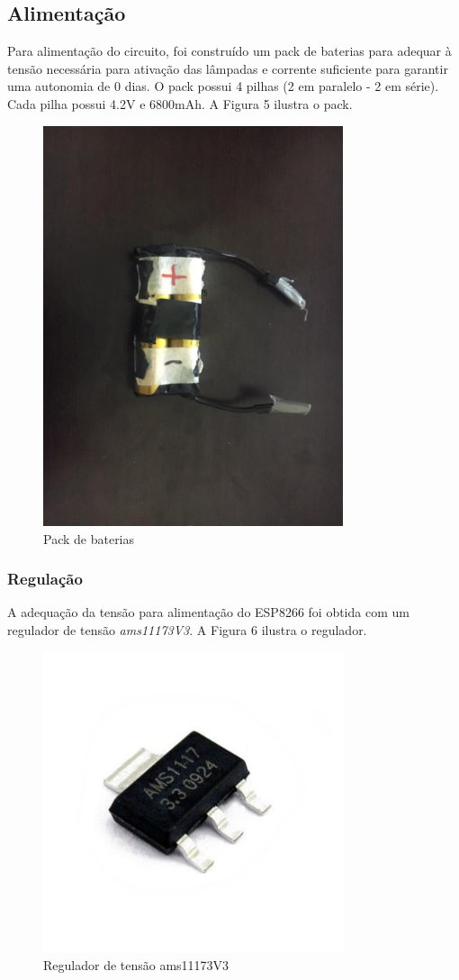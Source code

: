 \documentclass[
12pt,				%
openany,			%
twoside,			%
a4paper,			%
english,			%
french,				%
spanish,			%
brazil,				%
]{abntex2}
\begin{document}
\subsection{Alimentação}
Para alimentação do circuito, foi construído um pack de baterias para adequar à tensão necessária para ativação das lâmpadas e corrente suficiente para garantir uma autonomia de 0 dias. O pack possui 4 pilhas (2 em paralelo - 2 em série). Cada pilha possui 4.2V e 6800mAh. A Figura 5 ilustra o pack.

\begin{figure}[ht!]
    \centering
    \includegraphics[width=250pt]{images/pack.jpeg}
    \caption{Pack de baterias}
\end{figure}
\subsubsection{Regulação}
A adequação da tensão para alimentação do ESP8266 foi obtida com um regulador de tensão \textit{ams11173V3}. A Figura 6 ilustra o regulador.


\begin{figure}[ht!]
    \centering
    \includegraphics[width=250pt]{images/ams1117.jpg}
    \caption{Regulador de tensão ams11173V3}
\end{figure}
\end{document}
